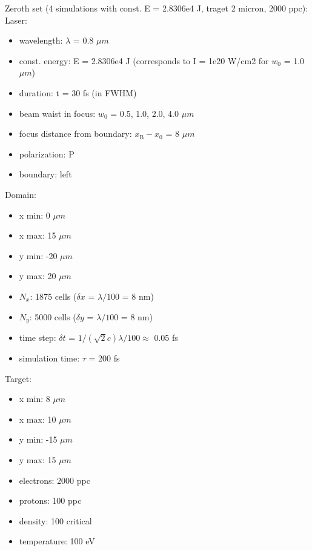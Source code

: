 \noindent
Zeroth set (4 simulations with const. E = 2.8306e4 J, traget 2 micron, 2000 ppc):
\noindent
Laser:
\begin{itemize}
	\item wavelength: $ \lambda $ = 0.8 $ \mu m $
	\item const. energy: E = 2.8306e4 J (corresponds to I = 1e20 W/cm2 for $ w_0 $ = 1.0 $ \mu m $)
	\item duration: t = 30 fs (in FWHM)
	\item beam waist in focus: $ w_0 $ = 0.5, 1.0, 2.0, 4.0 $ \mu m $
	\item focus distance from boundary: $ x_\mathrm{B} - x_0 $ = 8 $ \mu m $
	\item polarization: P
	\item boundary: left 
\end{itemize}
Domain:
\begin{itemize}
	\item x min: 0 $ \mu m $
	\item x max: 15 $ \mu m $
	\item y min: -20 $ \mu m $
	\item y max: 20 $ \mu m $
	\item $ N_x $: 1875 cells ($ \delta x $ = $ \lambda/100 $ = 8 nm)
	\item $ N_y $: 5000 cells ($ \delta y $ = $ \lambda/100 $ = 8 nm)
	\item time step: $ \delta t $ = $ 1/(\sqrt{2} c) \lambda /100 \approx $ 0.05 fs 
	\item simulation time: $ \tau $ = 200 fs
\end{itemize}
Target:
\begin{itemize}
	\item x min: 8 $ \mu m $
	\item x max: 10 $ \mu m $
	\item y min: -15 $ \mu m $
	\item y max: 15 $ \mu m $
	\item electrons: 2000 ppc
	\item protons: 100 ppc
	\item density: 100 critical
	\item temperature: 100 eV
\end{itemize}

